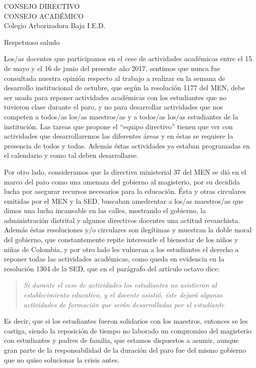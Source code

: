 \documentclass[letterpaper,spanish]{letter}
\begin{document}
\begin{letter}{CONSEJO DIRECTIVO\\CONSEJO ACADÉMICO\\Colegio Arborizadora Baja I.E.D.}
	
\opening{Respetuoso saludo}
Los/as docentes que participamos en el cese de actividades académicas entre el 15 de mayo y el 16 de junio del presente año 2017, sentimos que nunca fue consultada nuestra opinión respecto al trabajo a realizar en la semana de desarrollo institucional de octubre, que según la resolución 1177 del MEN, debe ser usada para reponer actividades académicas con los estudiantes que no tuvieron clase durante el paro, y no para desarrollar actividades que nos competen a todos/as los/as maestros/as y a todos/as los/as estudiantes de la institución. Las tareas que propone el ``equipo directivo'' tienen que ver con actividades que desarrollaremos las diferentes áreas y en éstas se requiere la presencia de todos y todas. Además éstas actividades ya estaban programadas en el calendario y como tal deben desarrollarse.

Por otro lado, consideramos que la directiva ministerial 37 del MEN se dió en el marco del paro como una amenaza del gobierno al magisterio, por su decidida lucha por asegurar recursos necesarios para la educación. Ésta y otras circulares emitidas por el MEN y la SED, buscaban amedrentar a los/as maestros/as que dimos una lucha incansable en las calles, mostrando el gobierno, la administración distrital y algunos directivos docentes una actitud revanchista. Además éstas resoluciones y/o circulares son ilegítimas y muestran la doble moral del gobierno, que constantemente repite interesarle el bienestar de los niños y niñas de Colombia, y por otro lado les vulneran a los estudiantes el derecho a reponer todas las actividades académicas, como queda en evidencia en la resolución 1304 de la SED, que en el parágrafo del artículo octavo dice: 
\begin{quote}
\textit{Si durante el cese de actividades los estudiantes no asistieron al establecimiento educativo, y el docente asistió, éste dejará algunas actividades de formación que serán desarrolladas por el estudiante}
\end{quote}
Es decir, que si los estudiantes fueron solidarios con los maestros, entonces se les castiga, siendo la reposición de tiempo no laborado un compromiso del magisterio con estudiantes y padres de familia, que estamos dispuestos a asumir, aunque gran parte de la responsabilidad de la duración del paro fue del mismo gobierno que no quiso solucionar la crisis antes.


\end{letter}
\end{document}
